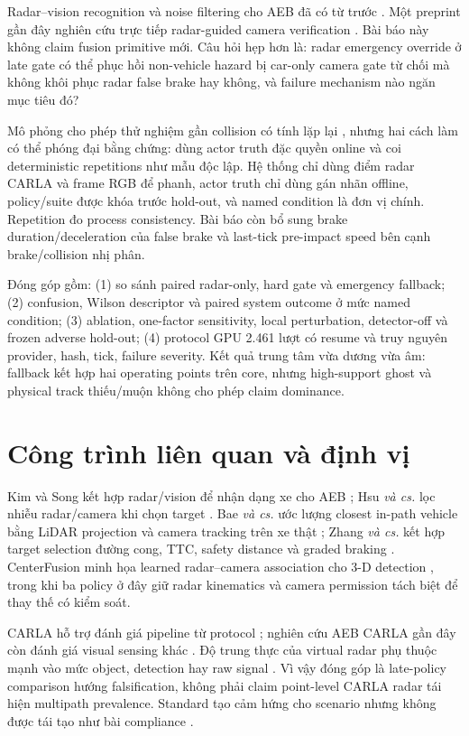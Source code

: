 \documentclass[conference]{IEEEtran}
\begin{document}
Radar--vision recognition và noise filtering cho AEB đã có từ trước
\cite{kim2013vehicle,hsu2015noise}. Một preprint gần đây nghiên cứu trực tiếp
radar-guided camera verification \cite{akula2026radarguided}. Bài báo này không
claim fusion primitive mới. Câu hỏi hẹp hơn là: radar emergency override ở late
gate có thể phục hồi non-vehicle hazard bị car-only camera gate từ chối mà không
khôi phục radar false brake hay không, và failure mechanism nào ngăn mục tiêu đó?

Mô phỏng cho phép thử nghiệm gần collision có tính lặp lại
\cite{dosovitskiy2017carla,kang2019testing}, nhưng hai cách làm có thể phóng đại
bằng chứng: dùng actor truth đặc quyền online và coi deterministic repetitions
như mẫu độc lập. Hệ thống chỉ dùng điểm radar CARLA và frame RGB để phanh, actor
truth chỉ dùng gán nhãn offline, policy/suite được khóa trước hold-out, và named
condition là đơn vị chính. Repetition đo process consistency. Bài báo còn bổ
sung brake duration/deceleration của false brake và last-tick pre-impact speed
bên cạnh brake/collision nhị phân.

Đóng góp gồm: (1) so sánh paired radar-only, hard gate và emergency fallback;
(2) confusion, Wilson descriptor và paired system outcome ở mức named condition;
(3) ablation, one-factor sensitivity, local perturbation, detector-off và frozen
adverse hold-out; (4) protocol GPU 2.461 lượt có resume và truy nguyên provider,
hash, tick, failure severity. Kết quả trung tâm vừa dương vừa âm: fallback kết
hợp hai operating points trên core, nhưng high-support ghost và physical track
thiếu/muộn không cho phép claim dominance.

\section{Công trình liên quan và định vị}
Kim và Song kết hợp radar/vision để nhận dạng xe cho AEB
\cite{kim2013vehicle}; Hsu \emph{và cs.} lọc nhiễu radar/camera khi chọn target
\cite{hsu2015noise}. Bae \emph{và cs.} ước lượng closest in-path vehicle bằng
LiDAR projection và camera tracking trên xe thật \cite{bae2021cipv}; Zhang
\emph{và cs.} kết hợp target selection đường cong, TTC, safety distance và graded
braking \cite{zhang2023curved}. CenterFusion minh họa learned radar--camera
association cho 3-D detection \cite{nabati2021centerfusion}, trong khi ba policy
ở đây giữ radar kinematics và camera permission tách biệt để thay thế có kiểm soát.

CARLA hỗ trợ đánh giá pipeline từ protocol \cite{gomez2022carla}; nghiên cứu AEB
CARLA gần đây còn đánh giá visual sensing khác \cite{feng2025dvs}. Độ trung thực
của virtual radar phụ thuộc mạnh vào mức object, detection hay raw signal
\cite{magosi2022radar}. Vì vậy đóng góp là late-policy comparison hướng
falsification, không phải claim point-level CARLA radar tái hiện multipath
prevalence. Standard tạo cảm hứng cho scenario nhưng không được tái tạo như bài
compliance \cite{iso15623,euroncap_aeb}.
\end{document}

